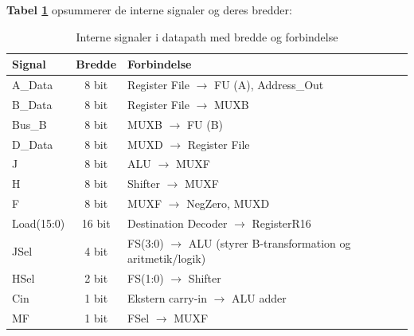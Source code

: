 \documentclass{article}
\begin{document}
\noindent
\textbf{Tabel \ref{tab:signal-widths}} opsummerer de interne signaler og deres bredder:

\begin{table}[H]
    \centering
    \begin{tabular}{l|c|l}
        \textbf{Signal} & \textbf{Bredde} & \textbf{Forbindelse} \\
        \hline
        A\_Data     & 8 bit  & Register File $\rightarrow$ FU (A), Address\_Out \\
        B\_Data     & 8 bit  & Register File $\rightarrow$ MUXB \\
        Bus\_B      & 8 bit  & MUXB $\rightarrow$ FU (B) \\
        D\_Data     & 8 bit  & MUXD $\rightarrow$ Register File \\
        J           & 8 bit  & ALU $\rightarrow$ MUXF \\
        H           & 8 bit  & Shifter $\rightarrow$ MUXF \\
        F           & 8 bit  & MUXF $\rightarrow$ NegZero, MUXD \\
        Load(15:0)  & 16 bit & Destination Decoder $\rightarrow$ RegisterR16 \\
        JSel        & 4 bit  & FS(3:0) $\rightarrow$ ALU (styrer B-transformation og aritmetik/logik) \\
        HSel        & 2 bit  & FS(1:0) $\rightarrow$ Shifter \\
        Cin         & 1 bit  & Ekstern carry-in $\rightarrow$ ALU adder \\
        MF          & 1 bit  & FSel $\rightarrow$ MUXF \\
    \end{tabular}
    \caption{Interne signaler i datapath med bredde og forbindelse}
    \label{tab:signal-widths}
\end{table}

\ifdefined\mainfile\else
\end{document}
